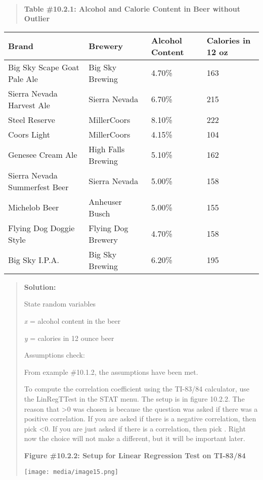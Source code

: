 \documentclass[]{book}
\begin{document}
\textbf{\\
}

\begin{quote}
\textbf{Table \#10.2.1: Alcohol and Calorie Content in Beer without Outlier}
\end{quote}

\begin{longtable}[]{@{}llll@{}}
\toprule
Brand & Brewery & Alcohol Content & Calories in 12 oz\tabularnewline
\midrule
\endhead
Big Sky Scape Goat Pale Ale & Big Sky Brewing & 4.70\% & 163\tabularnewline
Sierra Nevada Harvest Ale & Sierra Nevada & 6.70\% & 215\tabularnewline
Steel Reserve & MillerCoors & 8.10\% & 222\tabularnewline
Coors Light & MillerCoors & 4.15\% & 104\tabularnewline
Genesee Cream Ale & High Falls Brewing & 5.10\% & 162\tabularnewline
Sierra Nevada Summerfest Beer & Sierra Nevada & 5.00\% & 158\tabularnewline
Michelob Beer & Anheuser Busch & 5.00\% & 155\tabularnewline
Flying Dog Doggie Style & Flying Dog Brewery & 4.70\% & 158\tabularnewline
Big Sky I.P.A. & Big Sky Brewing & 6.20\% & 195\tabularnewline
\bottomrule
\end{longtable}

\begin{quote}
\textbf{Solution:}

State random variables

\emph{x} = alcohol content in the beer

\emph{y} = calories in 12 ounce beer

Assumptions check:

From example \#10.1.2, the assumptions have been met.

To compute the correlation coefficient using the TI-83/84 calculator, use the LinRegTTest in the STAT menu. The setup is in figure 10.2.2. The reason that \textgreater{}0 was chosen is because the question was asked if there was a positive correlation. If you are asked if there is a negative correlation, then pick \textless{}0. If you are just asked if there is a correlation, then pick . Right now the choice will not make a different, but it will be important later.

\textbf{Figure \#10.2.2: Setup for Linear Regression Test on TI-83/84}

\texttt{[image: media/image15.png]}
\end{quote}

\textbf{\\
}
\end{document}
